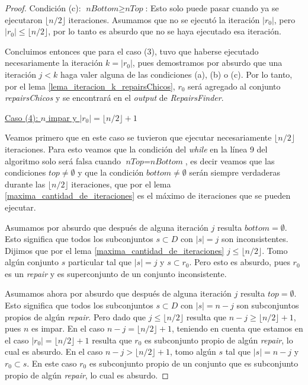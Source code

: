 \documentclass[11pt,a4paper,twoside]{tesis}
\newcommand{\parteEntera}{\lfloor n/2 \rfloor}
\begin{document}
\begin{proof}
Condición (c): \underline{$\textit{nBottom} \geq \textit{nTop}$}: Esto solo puede pasar cuando ya se ejecutaron $\parteEntera$ iteraciones. Asumamos que no se ejecutó la iteración $|r_0|$, pero $|r_0| \leq \parteEntera$, por lo tanto es absurdo que no se haya ejecutado esa iteración.

Concluimos entonces que para el caso (3), tuvo que haberse ejecutado necesariamente la iteración $k = |r_0|$, pues demostramos por absurdo que una iteración $j<k$ haga valer alguna de las condiciones (a), (b) o (c). Por lo tanto, por el lema \ref{lema_iteracion_k_repairsChicos}, $r_0$ será agregado al conjunto \textit{repairsChicos} y se encontrará en el \textit{output} de \textit{RepairsFinder}.  

\begin{center}
\underline{Caso (4): $n$ impar y $|r_0| = \parteEntera + 1$}
 \end{center}

Veamos primero que en este caso se tuvieron que ejecutar necesariamente $\parteEntera$ iteraciones. Para esto veamos que la condición del \textit{while} en la línea 9 del algoritmo solo será falsa cuando $\textit{nTop} = \textit{nBottom}$, es decir veamos que las condiciones $\textit{top} \neq \emptyset$ y que la condición $\textit{bottom} \neq \emptyset$ serán siempre verdaderas durante las $\parteEntera$ iteraciones, que por el lema \ref{maxima_cantidad_de_iteraciones} es el máximo de iteraciones que se pueden ejecutar. 

Asumamos por absurdo que después de alguna iteración $j$ resulta $\textit{bottom} = \emptyset$. Esto significa que todos los subconjuntos $s \subset D$ con $|s| = j$ son inconsistentes. Dijimos que por el lema \ref{maxima_cantidad_de_iteraciones} $j \leq \parteEntera$. Tomo algún conjunto $s$ particular tal que $|s| = j$ y $s \subset r_0$. Pero esto es absurdo, pues $r_0$ es un \textit{repair} y es superconjunto de un conjunto inconsistente. 

Asumamos ahora por absurdo que después de alguna iteración $j$ resulta $\textit{top} = \emptyset$. Esto significa que todos los subconjuntos $s \subset D$ con $|s| = n - j$ son subconjuntos propios de algún \textit{repair}. Pero dado que $j \leq \parteEntera$ resulta que $ n - j \geq \parteEntera + 1$, pues $n$ es impar. En el caso $n - j = \parteEntera + 1$, teniendo en cuenta que estamos en el caso $|r_0| = \parteEntera + 1$ resulta que $r_0$ es subconjunto propio de algún \textit{repair}, lo cual es absurdo. En el caso $ n - j > \parteEntera + 1$, tomo algún $s$ tal que $|s| = n - j$ y $r_0 \subset s$. En este caso $r_0$ es subconjunto propio de un conjunto que es subconjunto propio de algún \textit{repair}, lo cual es absurdo.


\end{proof}
\end{document}
